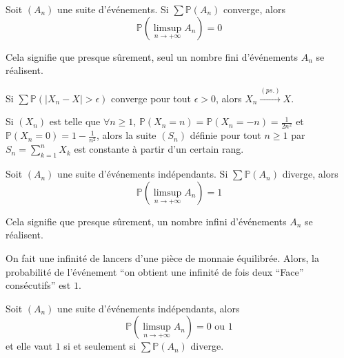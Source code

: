
  \begin{theorem}
    Soit $(A_n)$ une suite d'événements. Si $\sum \mathbb{P}(A_n)$ converge, alors
    \[ \mathbb{P} \left( \limsup_{n \rightarrow +\infty} A_n \right) = 0 \]
  \end{theorem}

  \begin{remark}
    Cela signifie que presque sûrement, seul un nombre fini d'événements $A_n$ se réalisent.
  \end{remark}

  \begin{corollary}
    Si $\sum \mathbb{P}(\vert X_n - X \vert > \epsilon)$ converge pour tout $\epsilon > 0$, alors $X_n \overset{(ps.)}{\longrightarrow} X$.
  \end{corollary}


  \begin{example}
    Si $(X_n)$ est telle que $\forall n \geq 1$, $\mathbb{P}(X_n = n) = \mathbb{P}(X_n = -n) = \frac{1}{2n^2}$ et $\mathbb{P}(X_n = 0) = 1 - \frac{1}{n^2}$, alors la suite $(S_n)$ définie pour tout $n \geq 1$ par $S_n = \sum_{k=1}^n X_k$ est constante à partir d'un certain rang.
  \end{example}


  \begin{theorem}
    Soit $(A_n)$ une suite d'événements indépendants. Si $\sum \mathbb{P}(A_n)$ diverge, alors
    \[ \mathbb{P} \left( \limsup_{n \rightarrow +\infty} A_n \right) = 1 \]
  \end{theorem}

  \begin{remark}
    Cela signifie que presque sûrement, un nombre infini d'événements $A_n$ se réalisent.
  \end{remark}


  \begin{example}
    On fait une infinité de lancers d'une pièce de monnaie équilibrée. Alors, la probabilité de l'événement ``on obtient une infinité de fois deux ``Face'' consécutifs'' est $1$.
  \end{example}

  \begin{corollary}
    Soit $(A_n)$ une suite d'événements indépendants, alors
    \[ \mathbb{P} \left( \limsup_{n \rightarrow +\infty} A_n \right) = 0 \text{ ou } 1 \]
    et elle vaut $1$ si et seulement si $\sum \mathbb{P}(A_n)$ diverge.
  \end{corollary}

